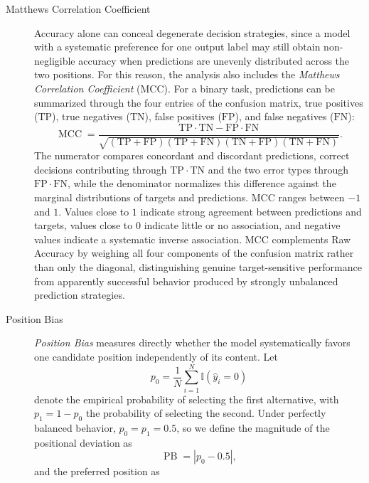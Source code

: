 \begin{description}
\item[Matthews Correlation Coefficient] Accuracy alone can conceal degenerate decision strategies, since a model with a systematic preference for one output label may still obtain non-negligible accuracy when predictions are unevenly distributed across the two positions. For this reason, the analysis also includes the \textit{Matthews Correlation Coefficient} (MCC). For a binary task, predictions can be summarized through the four entries of the confusion matrix, true positives (\(\mathrm{TP}\)), true negatives (\(\mathrm{TN}\)), false positives (\(\mathrm{FP}\)), and false negatives (\(\mathrm{FN}\)):
    \begin{equation}
    \operatorname{MCC} = \frac{\mathrm{TP} \cdot \mathrm{TN} - \mathrm{FP} \cdot \mathrm{FN}}{\sqrt{(\mathrm{TP}+\mathrm{FP})(\mathrm{TP}+\mathrm{FN})(\mathrm{TN}+\mathrm{FP})(\mathrm{TN}+\mathrm{FN})}}.
    \end{equation}
    The numerator compares concordant and discordant predictions, correct decisions contributing through \(\mathrm{TP} \cdot \mathrm{TN}\) and the two error types through \(\mathrm{FP} \cdot \mathrm{FN}\), while the denominator normalizes this difference against the marginal distributions of targets and predictions. MCC ranges between \(-1\) and \(1\). Values close to \(1\) indicate strong agreement between predictions and targets, values close to \(0\) indicate little or no association, and negative values indicate a systematic inverse association.
    MCC complements Raw Accuracy by weighing all four components of the confusion matrix rather than only the diagonal, distinguishing genuine target-sensitive performance from apparently successful behavior produced by strongly unbalanced prediction strategies.
\item[Position Bias] \textit{Position Bias} measures directly whether the model systematically favors one candidate position independently of its content. Let
\begin{equation}
p_0 = \frac{1}{N} \sum_{i=1}^{N} \mathbb{I}\left(\hat{y}_i = 0\right)
\end{equation}
denote the empirical probability of selecting the first alternative, with \(p_1 = 1-p_0\) the probability of selecting the second. Under perfectly balanced behavior, \(p_0 = p_1 = 0.5\), so we define the magnitude of the positional deviation as
\begin{equation}
\operatorname{PB} = \left|p_0 - 0.5\right|,
\end{equation}
and the preferred position as

\end{description}

